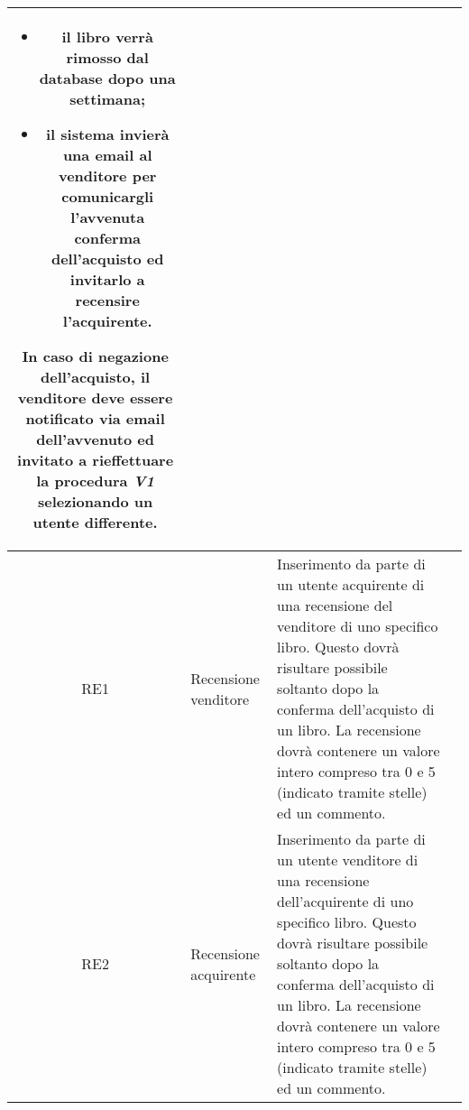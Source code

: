 \documentclass[10pt,a4paper]{book}
\begin{document}
\begin{tabular}{cp{3cm}p{9cm}p{1cm}}
\begin{itemize}
			\item il libro verrà rimosso dal database dopo una settimana;
			\item il sistema invierà una email al venditore per comunicargli l'avvenuta conferma dell'acquisto ed invitarlo a recensire l'acquirente.
		\end{itemize}
		In caso di negazione dell'acquisto, il venditore deve essere notificato via email dell'avvenuto ed invitato a rieffettuare la procedura \textit{V1} selezionando un utente differente. \\ \hline
		RE1&Recensione venditore&Inserimento da parte di un utente acquirente di una recensione del venditore di uno specifico libro. Questo dovrà risultare possibile soltanto dopo la conferma dell'acquisto di un libro. La recensione dovrà contenere un valore intero compreso tra 0 e 5 (indicato tramite stelle) ed un commento.\\ \hline
		RE2&Recensione acquirente&Inserimento da parte di un utente venditore di una recensione dell'acquirente di uno specifico libro. Questo dovrà risultare possibile soltanto dopo la conferma dell'acquisto di un libro. La recensione dovrà contenere un valore intero compreso tra 0 e 5 (indicato tramite stelle) ed un commento.\\ \hline
	\end{tabular}
	\newpage
	
\end{document}
